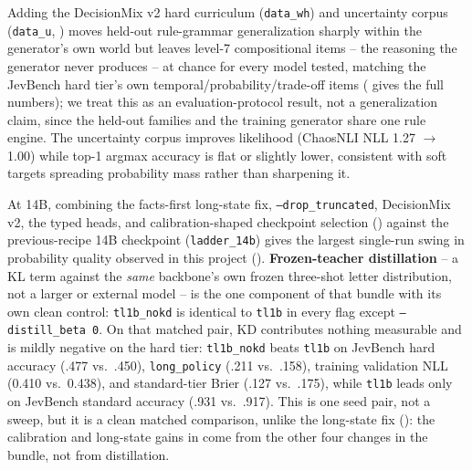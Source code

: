 Adding the DecisionMix v2 hard curriculum (\texttt{data\_wh}) and uncertainty corpus (\texttt{data\_u},
) moves held-out rule-grammar generalization sharply within the generator's own
world but leaves level-7 compositional items -- the reasoning the generator never produces -- at chance
for every model tested, matching the JevBench hard tier's own temporal/probability/trade-off items
( gives the full numbers); we treat this as an evaluation-protocol result, not a
generalization claim, since the held-out families and the training generator share one rule engine. The
uncertainty corpus improves likelihood (ChaosNLI NLL 1.27 $\to$ 1.00) while top-1 argmax accuracy is flat
or slightly lower, consistent with soft targets spreading probability mass rather than sharpening it.

At 14B, combining the facts-first long-state fix, \texttt{--drop\_truncated}, DecisionMix v2, the typed
heads, and calibration-shaped checkpoint selection () against the
previous-recipe 14B checkpoint (\texttt{ladder\_14b}) gives the largest single-run swing in probability
quality observed in this project (). \textbf{Frozen-teacher distillation} -- a KL term
against the \emph{same} backbone's own frozen three-shot letter distribution, not a larger or external
model -- is the one component of that bundle with its own clean control: \texttt{tl1b\_nokd} is identical
to \texttt{tl1b} in every flag except \texttt{--distill\_beta 0}. On that matched pair, KD contributes
nothing measurable and is mildly negative on the hard tier: \texttt{tl1b\_nokd} beats \texttt{tl1b} on
JevBench hard accuracy (.477 vs.\ .450), \texttt{long\_policy} (.211 vs.\ .158), training validation NLL
(0.410 vs.\ 0.438), and standard-tier Brier (.127 vs.\ .175), while \texttt{tl1b} leads only on JevBench
standard accuracy (.931 vs.\ .917). This is one seed pair, not a sweep, but it is a clean matched
comparison, unlike the long-state fix (): the calibration and long-state gains
in  come from the other four changes in the bundle, not from distillation.

